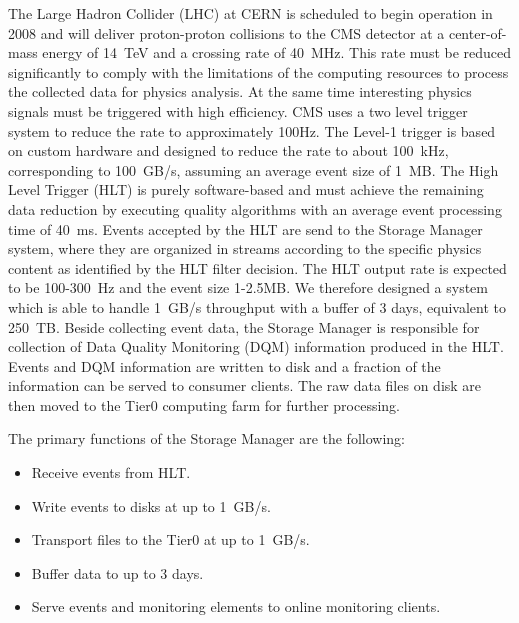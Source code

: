 
The Large Hadron Collider (LHC) at CERN is scheduled to begin operation in 2008 and will deliver proton-proton collisions to the CMS detector at a center-of-mass energy of 14~TeV and a crossing rate of 40~MHz. This rate must be reduced significantly to comply with the limitations of the computing resources to process the collected data for physics analysis. At the same time interesting physics signals must be triggered with high efficiency. CMS uses a two level trigger system to reduce the rate to approximately 100Hz. The Level-1 trigger is based on custom hardware and designed to reduce the rate to about 100~kHz, corresponding to 100~GB/s, assuming an average event size of 1~MB. The High Level Trigger (HLT) is purely software-based and  must achieve the remaining data reduction by executing quality algorithms with an average event processing time of 40~ms. Events accepted by the HLT are send to the Storage Manager system, where they are organized in streams according to the specific physics content as identified by the HLT filter decision. The HLT output rate is expected to be 100-300~Hz and the event size 1-2.5MB. We therefore designed a system which is able to handle 1~GB/s throughput with a buffer of 3 days, equivalent to 250~TB.
Beside collecting event data, the Storage Manager is responsible for collection of Data Quality Monitoring (DQM) information produced in the HLT. Events and DQM information are written to disk and a fraction of the information can be served to consumer clients. The raw data files on disk are then moved to the Tier0 computing farm for further processing. 

The primary functions of the Storage Manager are the following:
\begin{itemize}
\item Receive events from HLT.
\item Write events to disks at up to 1~GB/s.
\item Transport files to the Tier0 at up to 1~GB/s.
\item Buffer data to up to 3 days.
\item Serve events and monitoring elements to online monitoring clients.
\end{itemize}

